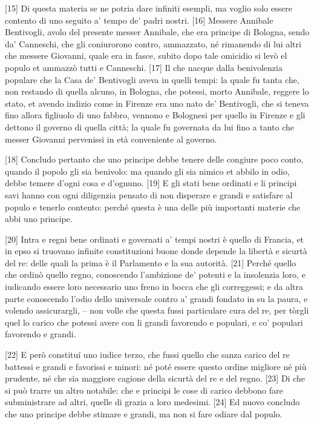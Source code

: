 {[}15{]} Di questa materia se ne potria dare infiniti esempli, ma voglio
solo essere contento di uno seguito a' tempo de' padri nostri. {[}16{]}
Messere Annibale Bentivogli, avolo del presente messer Annibale, che era
principe di Bologna, sendo da' Canneschi, che gli coniurorono contro,
ammazzato, né rimanendo di lui altri che messere Giovanni, quale era in
fasce, subito dopo tale omicidio si levò el populo et ammazzò tutti e
Canneschi. {[}17{]} Il che nacque dalla benivolenzia populare che la
Casa de' Bentivogli aveva in quelli tempi: la quale fu tanta che, non
restando di quella alcuno, in Bologna, che potessi, morto Annibale,
reggere lo stato, et avendo indizio come in Firenze era uno nato de'
Bentivogli, che si teneva fino allora figliuolo di uno fabbro, vennono e
Bolognesi per quello in Firenze e gli dettono il governo di quella
città; la quale fu governata da lui fino a tanto che messer Giovanni
pervenissi in età conveniente al governo.

{[}18{]} Concludo pertanto che uno principe debbe tenere delle congiure
poco conto, quando il popolo gli sia benivolo: ma quando gli sia nimico
et abbilo in odio, debbe temere d'ogni cosa e d'ognuno. {[}19{]} E gli
stati bene ordinati e li principi savi hanno con ogni diligenzia pensato
di non disperare e grandi e satisfare al populo e tenerlo contento:
perché questa è una delle più importanti materie che abbi uno principe.

{[}20{]} Intra e regni bene ordinati e governati a' tempi nostri è
quello di Francia, et in epso si truovano infinite constituzioni buone
donde depende la libertà e sicurtà del re: delle quali la prima è il
Parlamento e la sua autorità. {[}21{]} Perché quello che ordinò quello
regno, conoscendo l'ambizione de' potenti e la insolenzia loro, e
iudicando essere loro necessario uno freno in bocca che gli correggessi;
e da altra parte conoscendo l'odio dello universale contro a' grandi
fondato in su la paura, e volendo assicurargli, -- non volle che questa
fussi particulare cura del re, per tòrgli quel lo carico che potessi
avere con li grandi favorendo e populari, e co' populari favorendo e
grandi.

{[}22{]} E però constituí uno iudice terzo, che fussi quello che sanza
carico del re battessi e grandi e favorissi e minori: né poté essere
questo ordine migliore né più prudente, né che sia maggiore cagione
della sicurtà del re e del regno. {[}23{]} Di che si può trarre un altro
notabile: che e principi le cose di carico debbono fare subministrare ad
altri, quelle di grazia a loro medesimi. {[}24{]} Ed nuovo concludo che
uno principe debbe stimare e grandi, ma non si fare odiare dal populo.

